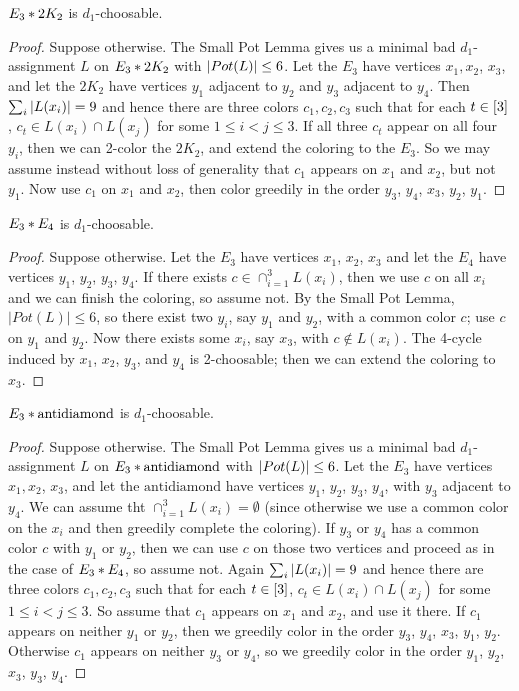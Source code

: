 \begin{lem}\label{E3Join2K2}
$E_3 \mbox{\hspace{2 pt}$\ast$\hspace{2 pt}} 2K_2$ is $d_1$-choosable.
\end{lem}
\begin{proof}
Suppose otherwise.  The Small Pot Lemma gives us a minimal bad $d_1$-assignment
$L$ on $E_3 \mbox{\hspace{2 pt}$\ast$\hspace{2 pt}} 2K_2$ with $\left|Pot(L)\right| \leq 6$.  Let the $E_3$ have
vertices $x_1, x_2$, $x_3$, and let the $2K_2$ have vertices $y_1$ adjacent
to $y_2$ and $y_3$ adjacent to $y_4$.  Then $\sum_i \left|L(x_i)\right| = 9$ and
hence there are three colors $c_1, c_2, c_3$ such that for each $t \in
\left[3\right]$, $c_t \in L(x_i) \cap L(x_j)$ for some $1 \leq i < j \leq 3$.  If
all three $c_t$ appear on all four $y_i$, then we can 2-color the $2K_2$, and
extend the coloring to the $E_3$.  So we may assume instead without loss of
generality that $c_1$ appears on $x_1$ and $x_2$, but not $y_1$.  Now use $c_1$
on $x_1$ and $x_2$, then color greedily in the order $y_3$, $y_4$, $x_3$,
$y_2$, $y_1$.
\end{proof}
\begin{lem}\label{E3JoinE4}
$E_3 \mbox{\hspace{2 pt}$\ast$\hspace{2 pt}} E_4$ is $d_1$-choosable.
\end{lem}
\begin{proof}
Suppose otherwise.
Let the $E_3$ have vertices $x_1$, $x_2$, $x_3$ and let the $E_4$ have
vertices $y_1$, $y_2$, $y_3$, $y_4$.  If there exists $c\in
\cap_{i=1}^3L(x_i)$, then we use $c$ on all $x_i$ and we can finish the
coloring, so assume not.  By the Small Pot Lemma, $|Pot(L)|\le 6$, so there
exist two $y_i$, say $y_1$ and $y_2$, with a common color $c$; use $c$ on $y_1$
and $y_2$.  Now there exists some $x_i$, say $x_3$, with $c\notin L(x_i)$.  The
4-cycle induced by $x_1$, $x_2$, $y_3$, and $y_4$ is 2-choosable; then we can
extend the coloring to $x_3$.
\end{proof}

\begin{lem}\label{E3JoinAntiDiamond}
$E_3 \mbox{\hspace{2 pt}$\ast$\hspace{2 pt}} \text{antidiamond}$ is $d_1$-choosable.
\end{lem}
\begin{proof}
Suppose otherwise.  The Small Pot Lemma gives us a minimal bad $d_1$-assignment
$L$ on $E_3 \mbox{\hspace{2 pt}$\ast$\hspace{2 pt}} \text{antidiamond}$ with $\left|Pot(L)\right| \leq 6$.  Let the
$E_3$ have vertices $x_1, x_2$, $x_3$, and let the $\text{antidiamond}$ have
vertices $y_1$, $y_2$, $y_3$, $y_4$, with $y_3$ adjacent to $y_4$.  We can
assume tht $\cap_{i=1}^3L(x_i)=\emptyset$ (since otherwise we use a common color
on the $x_i$ and then greedily complete the coloring).  If $y_3$ or
$y_4$ has a common color $c$ with $y_1$ or $y_2$, then we can use $c$ on those
two vertices and proceed as in the case of $E_3 \mbox{\hspace{2 pt}$\ast$\hspace{2 pt}} E_4$, so assume not.
Again $\sum_i \left|L(x_i)\right| = 9$ and hence there are three colors $c_1, c_2,
c_3$ such that for each $t \in \left[3\right]$, $c_t \in L(x_i) \cap L(x_j)$ for
some $1 \leq i < j \leq 3$.  So assume that $c_1$ appears on $x_1$ and $x_2$,
and use it there.  If $c_1$ appears on neither $y_1$ or $y_2$, then we greedily
color in the order $y_3$, $y_4$, $x_3$, $y_1$, $y_2$.  Otherwise $c_1$ appears
on neither $y_3$ or $y_4$, so we greedily color in the order $y_1$, $y_2$,
$x_3$, $y_3$, $y_4$.
\end{proof}

